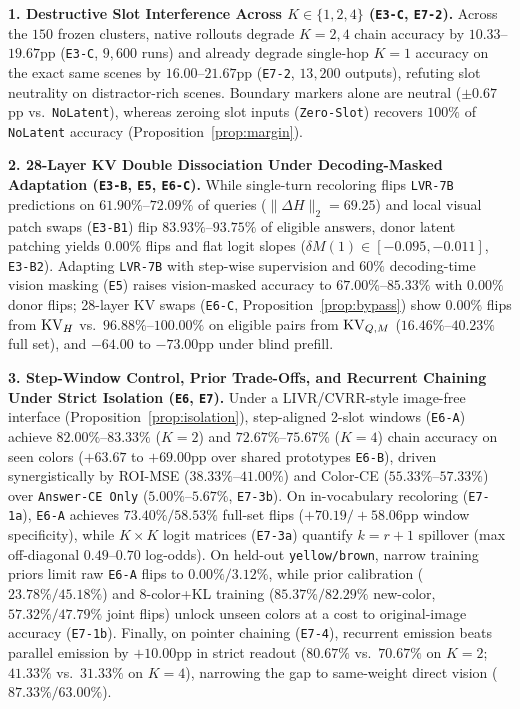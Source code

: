 \textbf{1. Destructive Slot Interference Across $K \in \{1, 2, 4\}$ (\texttt{E3-C}, \texttt{E7-2}).} Across the $150$ frozen clusters, native rollouts degrade $K=2, 4$ chain accuracy by $10.33$--$19.67$pp (\texttt{E3-C}, $9,600$ runs) and already degrade single-hop $K=1$ accuracy on the exact same scenes by $16.00$--$21.67$pp (\texttt{E7-2}, $13,200$ outputs), refuting slot neutrality on distractor-rich scenes. Boundary markers alone are neutral ($\pm 0.67$pp vs.\ \texttt{NoLatent}), whereas zeroing slot inputs (\texttt{Zero-Slot}) recovers $100\%$ of \texttt{NoLatent} accuracy (Proposition~\ref{prop:margin}).

\textbf{2. 28-Layer KV Double Dissociation Under Decoding-Masked Adaptation (\texttt{E3-B}, \texttt{E5}, \texttt{E6-C}).} While single-turn recoloring flips \texttt{LVR-7B} predictions on $61.90\%$--$72.09\%$ of queries ($\|\Delta H\|_2 = 69.25$) and local visual patch swaps (\texttt{E3-B1}) flip $83.93\%$--$93.75\%$ of eligible answers, donor latent patching yields $0.00\%$ flips and flat logit slopes ($\delta M(1) \in [-0.095, -0.011]$, \texttt{E3-B2}). Adapting \texttt{LVR-7B} with step-wise supervision and $60\%$ decoding-time vision masking (\texttt{E5}) raises vision-masked accuracy to $67.00\%$--$85.33\%$ with $0.00\%$ donor flips; 28-layer KV swaps (\texttt{E6-C}, Proposition~\ref{prop:bypass}) show $0.00\%$ flips from $\mathrm{KV}_H$ vs.\ $96.88\%$--$100.00\%$ on eligible pairs from $\mathrm{KV}_{Q,M}$ ($16.46\%$--$40.23\%$ full set), and $-64.00$ to $-73.00$pp under blind prefill.

\textbf{3. Step-Window Control, Prior Trade-Offs, and Recurrent Chaining Under Strict Isolation (\texttt{E6}, \texttt{E7}).} Under a LIVR/CVRR-style image-free interface (Proposition~\ref{prop:isolation}), step-aligned 2-slot windows (\texttt{E6-A}) achieve $82.00\%$--$83.33\%$ ($K=2$) and $72.67\%$--$75.67\%$ ($K=4$) chain accuracy on seen colors ($+63.67$ to $+69.00$pp over shared prototypes \texttt{E6-B}), driven synergistically by ROI-MSE ($38.33\%$--$41.00\%$) and Color-CE ($55.33\%$--$57.33\%$) over \texttt{Answer-CE Only} ($5.00\%$--$5.67\%$, \texttt{E7-3b}). On in-vocabulary recoloring (\texttt{E7-1a}), \texttt{E6-A} achieves $73.40\%/58.53\%$ full-set flips ($+70.19/+58.06$pp window specificity), while $K\times K$ logit matrices (\texttt{E7-3a}) quantify $k=r+1$ spillover (max off-diagonal $0.49$--$0.70$ log-odds). On held-out \texttt{yellow/brown}, narrow training priors limit raw \texttt{E6-A} flips to $0.00\%/3.12\%$, while prior calibration ($23.78\%/45.18\%$) and 8-color+KL training ($85.37\%/82.29\%$ new-color, $57.32\%/47.79\%$ joint flips) unlock unseen colors at a cost to original-image accuracy (\texttt{E7-1b}). Finally, on pointer chaining (\texttt{E7-4}), recurrent emission beats parallel emission by $+10.00$pp in strict readout ($80.67\%$ vs.\ $70.67\%$ on $K=2$; $41.33\%$ vs.\ $31.33\%$ on $K=4$), narrowing the gap to same-weight direct vision ($87.33\%/63.00\%$).
